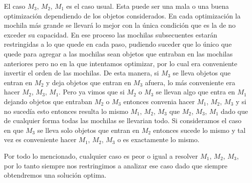 El caso $M_3$, $M_2$, $M_1$ es el caso usual. Esta puede ser una mala o una buena optimización dependiendo de los objetos considerados. En cada optimización la mochila más grande se llevará lo mejor con la única condición que es la de no exceder su capacidad. En ese proceso las mochilas subsecuentes estarán restringidas a lo que quede en cada paso, pudiendo suceder que lo único que quede para agregar a las mochilas sean objetos que entraban en las mochilas anteriores pero no en la que intentamos optimizar, por lo cual era conveniente invertir el orden de las mochilas. 
De esta manera, si $M_3$ se lleva objetos que entran en $M_2$ y deja objetos que entran en $M_3$ afuera, lo más conveniente era hacer $M_2$, $M_3$, $M_1$. Pero ya vimos que si $M_2$ o $M_3$ se llevan algo que entra en $M_1$ dejando objetos que entraban $M_2$ o $M_3$ entonces convenia hacer $M_1$, $M_2$, $M_3$ y si no sucedía esto entonces resulta lo mismo $M_1$, $M_2$, $M_3$ que $M_2$, $M_3$, $M_1$ dado que de cualquier forma todas las mochilas se llevarian todo.
Si consideramos el caso en que $M_3$ se lleva solo objetos que entran en $M_2$ entonces sucede lo mismo y tal vez es conveniente hacer $M_1$, $M_2$, $M_3$ o es exactamente lo mismo. 

Por todo lo mencionado, cualquier caso es peor o igual a resolver $M_1$, $M_2$, $M_3$, por lo tanto siempre nos restringimos a analizar ese caso dado que siempre obtendremos una solución optima.
